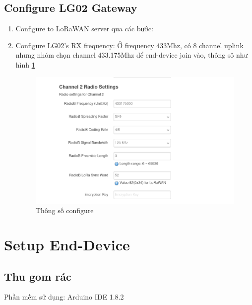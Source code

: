 \subsection{Configure LG02 Gateway}
\begin{enumerate}
    \item Configure to LoRaWAN server qua các bước:

    \item Configure LG02's RX frequency: Ở frequency 433Mhz, có 8 channel uplink nhưng nhóm chọn channel 433.175Mhz để end-device join vào, thông sô như hình \ref{fig:radio_config}
    \begin{figure}[H]
        \centering
        \includegraphics[width=\textwidth]{images/Quanh/Radio_config.png}
        \caption{Thông số configure}
        \label{fig:radio_config}
    \end{figure}
\end{enumerate}


\section{Setup End-Device}
\subsection{Thu gom rác}
Phần mềm sử dụng: Arduino IDE 1.8.2

